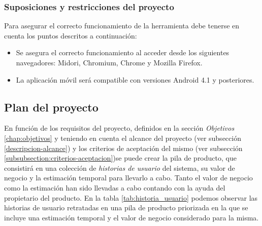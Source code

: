 		\subsubsection{Suposiciones y restricciones del proyecto}
		Para asegurar el correcto funcionamiento de la herramienta debe tenerse en cuenta los puntos descritos a continuación:
		
		\begin{itemize}[label={$\bullet$},labelindent=\parindent,leftmargin=2cm]
			\item Se asegura el correcto funcionamiento al acceder desde los siguientes navegadores: Midori, Chromium, Chrome y Mozilla Firefox.
			\item La aplicación móvil será compatible con versiones Android 4.1 y posteriores.
		\end{itemize}

	\subsection{Plan del proyecto}
	En función de los requisitos del proyecto, definidos en la sección \textit{Objetivos} \ref{chap:objetivos} y teniendo en cuenta el alcance del proyecto (ver subsección \ref{descripcion-alcance}) y los criterios de aceptación del mismo (ver subsección \ref{subsubsection:criterios-aceptacion})se puede crear la pila de producto, que consistirá en una colección de \textit{historias de usuario} del sistema, su valor de negocio y la estimación temporal para llevarlo a cabo. Tanto el valor de negocio como la estimación han sido llevadas a cabo contando con la ayuda del propietario del producto.
	En la tabla \ref{tab:historia_usuario} podemos observar las historias de usuario retratadas en una pila de producto priorizada en la que se incluye una estimación temporal y el valor de negocio considerado para la misma.
	
